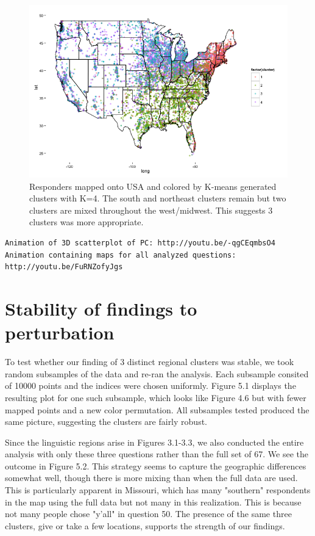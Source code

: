\documentclass[english]{article}\usepackage{graphicx, color}
\numberwithin{equation}{section}
\numberwithin{figure}{section}
\begin{document}
\begin{figure}
\begin{center}
\includegraphics[scale=.5]{pcamap4clusters.png}
\end{center}
\caption{Responders mapped onto USA and colored by K-means generated clusters with K=4. The south and northeast clusters remain but two clusters are mixed throughout the west/midwest. This suggests 3 clusters was more appropriate.}
\end{figure}

\begin{verbatim}
Animation of 3D scatterplot of PC: http://youtu.be/-qgCEqmbsO4
Animation containing maps for all analyzed questions: http://youtu.be/FuRNZofyJgs
\end{verbatim}


\section{Stability of findings to perturbation}
To test whether our finding of 3 distinct regional clusters was stable, we took random subsamples of the data and re-ran the analysis. Each subsample consited of 10000 points and the indices were chosen uniformly. Figure 5.1 displays the resulting plot for one such subsample, which looks like Figure 4.6 but with fewer mapped points and a new color permutation. All subsamples tested produced the same picture, suggesting the clusters are fairly robust. 

Since the linguistic regions arise in Figures 3.1-3.3, we also conducted the entire analysis with only these three questions rather than the full set of 67. We see the outcome in Figure 5.2. This strategy seems to capture the geographic differences somewhat well, though there is more mixing than when the full data are used. This is particularly apparent in Missouri, which has many "southern" respondents in the map using the full data but not many in this realization. This is because not many people chose "y'all" in question 50. The presence of the same three clusters, give or take a few locations, supports the strength of our findings. 
\end{document}
